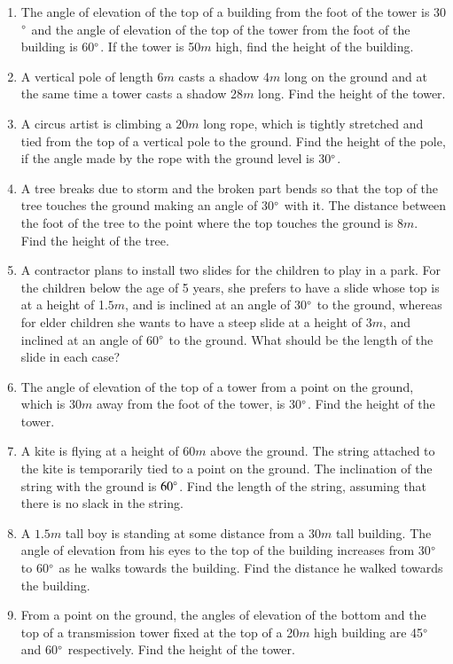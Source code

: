 \begin{enumerate}[label=\thesubsection.\arabic*.,ref=\thesubsection.\theenumi]
%
\item The angle of elevation of the top of a building from the foot of the tower is 30$\degree$ and the angle of elevation of the top of the tower from the foot of the building is 60$\degree$. If the tower is 50$m$ high, find the height of the building.
\item  A vertical pole of length 6$m$ casts a shadow 4$m$ long on the ground and at the same time a tower casts a shadow 28$m$ long. Find the height of the tower.
\item A circus artist is climbing a $20m$ long rope, which is tightly stretched and tied from the top of a vertical pole to the ground.  Find the height of the pole, if the angle made by the rope with the ground level is 30$\degree$.
%
\item A tree breaks due to storm and the broken part bends so that the top of the tree touches the ground making an angle of 30$\degree$ with it.  The distance between the foot of the tree to the point where the top touches the ground is $8m$.  Find the height of the tree.
%
\item A contractor plans to install two slides for the children to play in a park.  For the children below the age of 5 years, she prefers to have a slide whose top is at a height of 1.$5m$, and is inclined at an angle of 30$\degree$  to the ground, whereas for elder children she wants to have a steep slide at a height of $3m$, and inclined at an angle of 60$\degree$ to the ground.  What should be the length of the slide in each case?
%
\item The angle of elevation of the top of a tower from a point on the ground, which is $30m$ away from the foot of the tower, is 30$\degree$.  Find the height of the tower.
%
\item A kite is flying at a height of $60m$ above the ground.  The string attached to the kite is temporarily tied to a point on the ground.  The inclination of the string with the ground is $60\degree$.  Find the length of the string, assuming that there is no slack in the string.
%
\item A $1.5m$ tall boy is standing at some distance from a $30m$ tall building.  The angle of elevation from his eyes to the top of the building increases from 30$\degree$
 to 60$\degree $ as he walks towards the building.  Find the distance he walked towards the building.

\item From a point on the ground, the angles of elevation of the bottom and the top of a transmission tower fixed at the top of a 20$m$ high building are 45$\degree$ and 60$\degree$ respectively. Find the height of the tower.


\end{enumerate}
